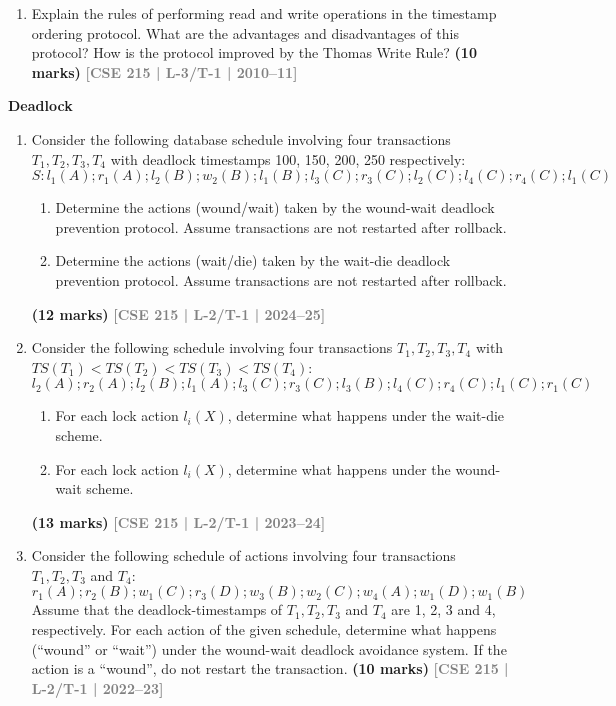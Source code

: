 \documentclass[12pt,a3paper]{article}
\newcommand{\yr}[1]{\hfill\textcolor{gray}{\small\textbf{[#1]}}}
\newcommand{\mk}[1]{\textcolor{orange!70!black}{\small\textbf{(#1 marks)}}}
\newcommand{\subtopic}[2]{%
  \vspace{10pt}
  \noindent\begin{tcolorbox}[colback=#1!8,colframe=#1,boxrule=0.6pt,arc=4pt,
    left=6pt,right=6pt,top=4pt,bottom=4pt]
    \small\bfseries\textcolor{#1}{#2}
  \end{tcolorbox}
  \vspace{2pt}
}
\begin{document}
\begin{enumerate}
\item Explain the rules of performing read and write operations in the timestamp ordering protocol. What are the advantages and disadvantages of this protocol? How is the protocol improved by the Thomas Write Rule?
\mk{10} \yr{CSE 215 | L-3/T-1 | 2010--11}

\end{enumerate}

\subtopic{cE}{Deadlock}
\label{sub:s7-deadlock}

\begin{enumerate}

\item Consider the following database schedule involving four transactions $T_1, T_2, T_3, T_4$ with deadlock timestamps 100, 150, 200, 250 respectively:
\[S\colon l_1(A); r_1(A); l_2(B); w_2(B); l_1(B); l_3(C); r_3(C); l_2(C); l_4(C); r_4(C); l_1(C)\]
\begin{enumerate}
  \item Determine the actions (wound/wait) taken by the wound-wait deadlock prevention protocol. Assume transactions are not restarted after rollback.
  \item Determine the actions (wait/die) taken by the wait-die deadlock prevention protocol. Assume transactions are not restarted after rollback.
\end{enumerate}
\mk{12} \yr{CSE 215 | L-2/T-1 | 2024--25}

\item Consider the following schedule involving four transactions $T_1, T_2, T_3, T_4$ with $TS(T_1) < TS(T_2) < TS(T_3) < TS(T_4)$:
\[l_2(A); r_2(A); l_2(B); l_1(A); l_3(C); r_3(C); l_3(B); l_4(C); r_4(C); l_1(C); r_1(C)\]
\begin{enumerate}
  \item For each lock action $l_i(X)$, determine what happens under the wait-die scheme.
  \item For each lock action $l_i(X)$, determine what happens under the wound-wait scheme.
\end{enumerate}
  \mk{13} \yr{CSE 215 | L-2/T-1 | 2023--24}

\item Consider the following schedule of actions involving four transactions $T_1, T_2, T_3$ and $T_4$:
\[r_1(A); r_2(B); w_1(C); r_3(D); w_3(B); w_2(C); w_4(A); w_1(D); w_1(B)\]
Assume that the deadlock-timestamps of $T_1, T_2, T_3$ and $T_4$ are 1, 2, 3 and 4, respectively. For each action of the given schedule, determine what happens (``wound'' or ``wait'') under the wound-wait deadlock avoidance system. If the action is a ``wound'', do not restart the transaction.
  \mk{10} \yr{CSE 215 | L-2/T-1 | 2022--23}


\end{enumerate}
\end{document}

